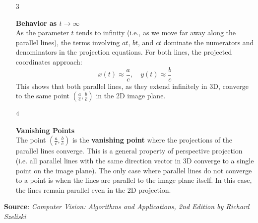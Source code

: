 \documentclass[12pt]{report}
\begin{document}
\begin{enumerate}
\begin{enumerate}
        \item[3] 
        
        \textbf{Behavior as \( t \to \infty \)} \\
        As the parameter \( t \) tends to infinity (i.e., as we move far away along the parallel lines), the terms involving \( at \), \( bt \), and \( ct \) 
        dominate the numerators and denominators in the projection equations. For both lines, the projected coordinates approach:
        \[
        x(t) \approx \frac{a}{c}, \quad y(t) \approx \frac{b}{c}
        \]
        This shows that both parallel lines, as they extend infinitely in 3D, converge to the same point \(\left(\frac{a}{c}, \frac{b}{c}\right)\) in the 2D 
        image plane.

        \item[4] 
        
        \textbf{Vanishing Points} \\
        The point \(\left(\frac{a}{c}, \frac{b}{c}\right)\) is the \textbf{vanishing point} where the projections of the parallel lines converge. This is a 
        general property of perspective projection (i.e. all parallel lines with the same direction vector in 3D converge to a single point on the image plane). 
        The only case where parallel lines do not converge to a point is when the lines are parallel to the image plane itself. In this case, the lines 
        remain parallel even in the 2D projection.

    \end{enumerate}

    \textbf{Source}: \textit{Computer Vision: Algorithms and Applications, 2nd Edition by Richard Szeliski}


\end{enumerate}
\end{document}
